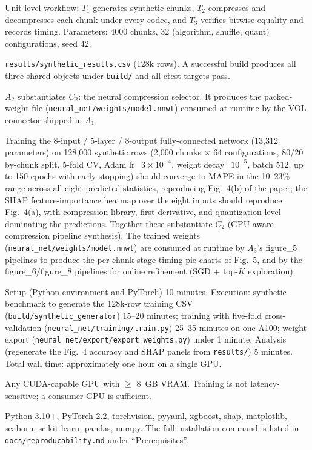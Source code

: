 \documentclass[conference]{IEEEtran}
\begin{document}
\artcomp
Unit-level workflow: $T_1$ generates synthetic chunks, $T_2$
compresses and decompresses each chunk under every codec, and
$T_3$ verifies bitwise equality and records timing. Parameters:
4000 chunks, 32 (algorithm, shuffle, quant) configurations, seed
42.

\artout
\texttt{results/synthetic\_results.csv} (128k rows). A successful
build produces all three shared objects under \texttt{build/} and
all ctest targets pass.


\newartifact

\artrel
$A_2$ substantiates $C_2$: the neural compression selector. It
produces the packed-weight file
(\texttt{neural\_net/weights/model.nnwt}) consumed at runtime by
the VOL connector shipped in $A_1$.

Training the 8-input / 5-layer / 8-output fully-connected
network (13{,}312 parameters) on 128{,}000 synthetic rows
(2{,}000 chunks $\times$ 64 configurations, 80/20 by-chunk
split, 5-fold CV, Adam lr=$3\times10^{-4}$, weight
decay=$10^{-5}$, batch 512, up to 150 epochs with early
stopping) should converge to MAPE in the 10--23\% range
across all eight predicted statistics, reproducing Fig.~4(b)
of the paper; the SHAP feature-importance heatmap over the
eight inputs should reproduce Fig.~4(a), with compression
library, first derivative, and quantization level dominating
the predictions. Together these substantiate $C_2$ (GPU-aware
compression pipeline synthesis). The trained weights
(\texttt{neural\_net/weights/model.nnwt}) are consumed at
runtime by $A_3$'s figure\_5 pipelines to produce the
per-chunk stage-timing pie charts of Fig.~5, and by the
figure\_6/figure\_8 pipelines for online refinement (SGD +
top-$K$ exploration).

\arttime
Setup (Python environment and PyTorch) 10 minutes. Execution:
synthetic benchmark to generate the 128k-row training CSV
(\texttt{build/synthetic\_generator}) 15--20
minutes; training with five-fold cross-validation
(\texttt{neural\_net/training/train.py}) 25--35 minutes on one A100;
weight export (\texttt{neural\_net/export/export\_weights.py}) under 1 minute.
Analysis (regenerate the Fig.~4 accuracy and SHAP panels from
\texttt{results/}) 5 minutes. Total wall time: approximately
one hour on a single GPU.

\artin

Any CUDA-capable GPU with $\geq$ 8~GB VRAM. Training is not
latency-sensitive; a consumer GPU is sufficient.

Python 3.10+, PyTorch 2.2, torchvision, pyyaml, xgboost, shap,
matplotlib, seaborn, scikit-learn, pandas, numpy. The full
installation command is listed in
\texttt{docs/reproducability.md} under ``Prerequisites''.
\end{document}
